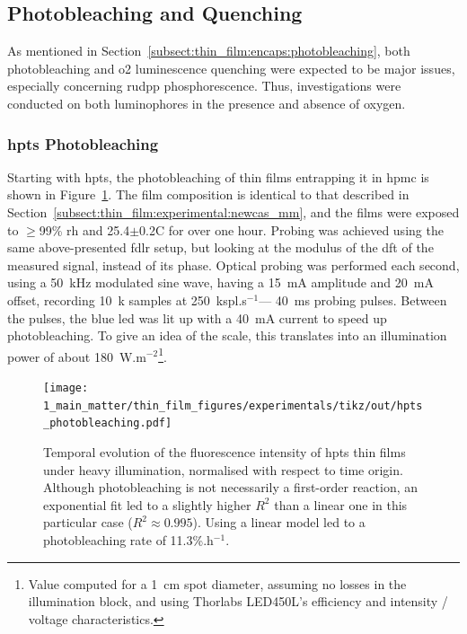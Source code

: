 \subsection{Photobleaching and Quenching}\label{subsect:thin_film:experimental:pbl}

As mentioned in Section~\ref{subsect:thin_film:encaps:photobleaching}, both photobleaching and \gls{o2} luminescence quenching were expected to be major issues, especially concerning \gls{rudpp} phosphorescence. Thus, investigations were conducted on both luminophores in the presence and absence of oxygen.

\subsubsection{\texorpdfstring{\gls{hpts}}{HPTS} Photobleaching}\label{subsect:thin_film:experimental:pbl:hpts}

Starting with \gls{hpts}, the photobleaching of thin films entrapping it in \gls{hpmc} is shown in Figure~\ref{fig:thin_film:experimental:hpts_photobleaching}. The film composition is identical to that described in Section~\ref{subsect:thin_film:experimental:newcas_mm}, and the films were exposed to $\geq$99\% \gls{rh} and 25.4$\pm$0.2{\degree}C for over one hour. Probing was achieved using the same above-presented \gls{fdlr} setup, but looking at the modulus of the \gls{dft} of the measured signal, instead of its phase. Optical probing was performed each second, using a 50~kHz modulated sine wave, having a 15~mA amplitude and 20~mA offset, recording 10~k samples at 250~kspl.s$^{-1}$---\ie{} 40~ms probing pulses. Between the pulses, the blue \gls{led} was lit up with a 40~mA current to speed up photobleaching. To give an idea of the scale, this translates into an illumination power of about 180~W.m$^{-2}$\footnote{Value computed for a 1~cm spot diameter, assuming no losses in the illumination block, and using Thorlabs LED450L's efficiency and intensity / voltage characteristics.}.

\begin{figure}
	\centering
	\texttt{[image: 1\_main\_matter/thin\_film\_figures/experimentals/tikz/out/hpts\_photobleaching.pdf]}
	\caption[\gls{hpts} photobleaching.]{Temporal evolution of the fluorescence intensity of \gls{hpts} thin films under heavy illumination, normalised with respect to time origin. Although photobleaching is not necessarily a first-order reaction\cite{demchenko2020}, an exponential fit led to a slightly higher $R^2$ than a linear one in this particular case ($R^2 \approx 0.995$). Using a linear model led to a photobleaching rate of 11.3\%.h$^{-1}$.}
	\label{fig:thin_film:experimental:hpts_photobleaching}
\end{figure}

